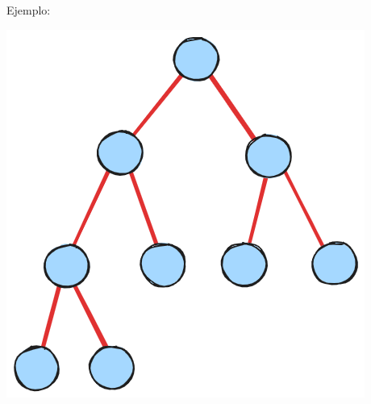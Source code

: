 \documentclass[notheorems]{beamer}
\begin{document}
\begin{frame}{Ejemplo:}
\begin{center}
\includegraphics[scale = 0.5]{HeapPicture.png}
\end{center}
\end{frame}
\end{document}
